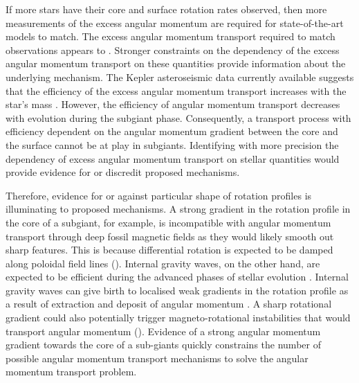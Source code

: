 If more stars have their core and surface rotation rates observed, then more measurements of the excess angular momentum are required for state-of-the-art models to match.
The excess angular momentum transport required to match observations appears to .
Stronger constraints on the dependency of the excess angular momentum transport on these quantities provide information about the underlying mechanism.
The Kepler asteroseismic data currently available suggests that the efficiency of the excess angular momentum transport increases with the star's mass \citep{eggenberger_asteroseismology_2019}.
However, the efficiency of angular momentum transport decreases with evolution during the subgiant phase.
Consequently, a transport process with efficiency dependent on the angular momentum gradient between the core and the surface cannot be at play in subgiants.
Identifying with more precision the dependency of excess angular momentum transport on stellar quantities would provide evidence for or discredit proposed mechanisms.

Therefore, evidence for or against particular shape of rotation profiles is illuminating to proposed mechanisms.
A strong gradient in the rotation profile in the core of a subgiant, for example, is incompatible with angular momentum transport through deep fossil magnetic fields \citep{gough_effect_1990} as they would likely smooth out sharp features.
 This is because differential rotation is expected to be damped along poloidal field lines (\citealp{garaud_rotationally_2002, strugarek_magnetic_2011}).
 Internal gravity waves, on the other hand, are expected to be efficient during the advanced phases of stellar evolution \citep{charbonnel_deep_2008}. 
Internal gravity waves can give birth to localised weak gradients in the rotation profile as a result of extraction and deposit of angular momentum \citep{charbonnel_influence_2005}. 
A sharp rotational gradient could also potentially trigger magneto-rotational instabilities that would transport angular momentum (\citealp{balbus_stability_1994,arlt_differential_2003,menou_magnetorotational_2006, fuller_asteroseismology_2015, fuller_slowing_2019,moyano_asteroseismology_2022}). 
Evidence of a strong angular momentum gradient towards the core of a sub-giants quickly constrains the number of possible angular momentum transport mechanisms to solve the angular momentum transport problem.

